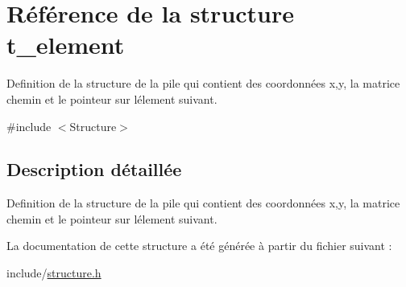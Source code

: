 \hypertarget{structt__element}{}\section{Référence de la structure t\+\_\+element}
\label{structt__element}


Definition de la structure de la pile qui contient des coordonnées x,y, la matrice chemin et le pointeur sur l\textquotesingle{}élement suivant.  




{\ttfamily \#include $<$Structure$>$}



\subsection{Description détaillée}
Definition de la structure de la pile qui contient des coordonnées x,y, la matrice chemin et le pointeur sur l\textquotesingle{}élement suivant. 

La documentation de cette structure a été générée à partir du fichier suivant \+:\begin{DoxyCompactItemize}
\item 
include/\hyperlink{structure_8h}{structure.\+h}\end{DoxyCompactItemize}
